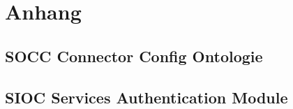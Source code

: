 
\chapter{Anhang} %
\label{cha:anhang}


\section{SOCC Connector Config Ontologie} %
\label{sec:socc_connector_config_ontologie}




\section{SIOC Services Authentication Module} %
\label{sec:sioc_services_authentication_module}




